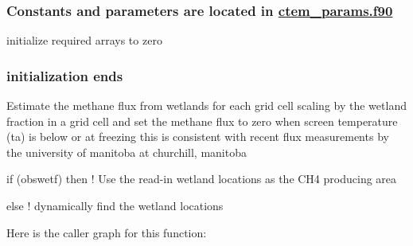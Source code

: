  \subsubsection*{Constants and parameters are located in \hyperlink{ctem__params_8f90}{ctem\+\_\+params.\+f90} }

initialize required arrays to zero

\subsubsection*{initialization ends }

Estimate the methane flux from wetlands for each grid cell scaling by the wetland fraction in a grid cell and set the methane flux to zero when screen temperature (ta) is below or at freezing this is consistent with recent flux measurements by the university of manitoba at churchill, manitoba

if (obswetf) then ! Use the read-\/in wetland locations as the C\+H4 producing area

else ! dynamically find the wetland locations

Here is the caller graph for this function\+:


